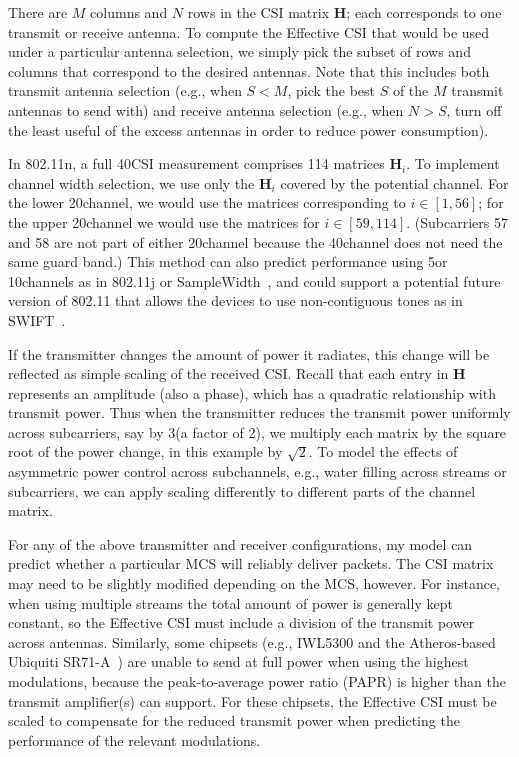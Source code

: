  There are $M$ columns and $N$ rows in the CSI matrix $\mathbf{H}$; each corresponds to one transmit or receive antenna. To compute the Effective CSI that would be used under a particular antenna selection, we simply pick the subset of rows and columns that correspond to the desired antennas. Note that this includes both transmit antenna selection (e.g., when $S<M$, pick the best $S$ of the $M$ transmit antennas to send with) and receive antenna selection (e.g., when $N>S$, turn off the least useful of the excess antennas in order to reduce power consumption).

 In 802.11n, a full 40\MHz CSI measurement comprises 114 matrices $\mathbf{H}_i$. To implement channel width selection, we use only the $\mathbf{H}_i$ covered by the potential channel. For the lower 20\MHz channel, we would use the matrices corresponding to $i \in [1,56]$; for the upper 20\MHz channel we would use the matrices for $i \in [59,114]$. (Subcarriers 57 and 58 are not part of either 20\MHz channel because the 40\MHz channel does not need the same guard band.) This method can also predict performance using 5\MHz or 10\MHz channels as in 802.11j or SampleWidth~\cite{Chandra_SampleWidth}, and could support a potential future version of 802.11 that allows the devices to use non-contiguous tones as in SWIFT~\cite{Rahul_SWIFT}.

 If the transmitter changes the amount of power it radiates, this change will be reflected as simple scaling of the received CSI. Recall that each entry in $\mathbf{H}$ represents an amplitude (also a phase), which has a quadratic relationship with transmit power. Thus when the transmitter reduces the transmit power uniformly across subcarriers, say by 3\dB (a factor of 2), we multiply each matrix by the square root of the power change, in this example by $\sqrt{2}$. To model the effects of asymmetric power control across subchannels, e.g., water filling across streams or subcarriers, we can apply scaling differently to different parts of the channel matrix.

 For any of the above transmitter and receiver configurations, my model can predict whether a particular MCS will reliably deliver packets. The CSI matrix may need to be slightly modified depending on the MCS, however. For instance, when using multiple streams the total amount of power is generally kept constant, so the Effective CSI must include a division of the transmit power across antennas. Similarly, some chipsets (e.g., IWL5300 and the Atheros-based Ubiquiti SR71-A~\cite{sr71a}) are unable to send at full power when using the highest modulations, because the peak-to-average power ratio (PAPR) is higher than the transmit amplifier(s) can support. For these chipsets, the Effective CSI must be scaled to compensate for the reduced transmit power when predicting the performance of the relevant modulations.

